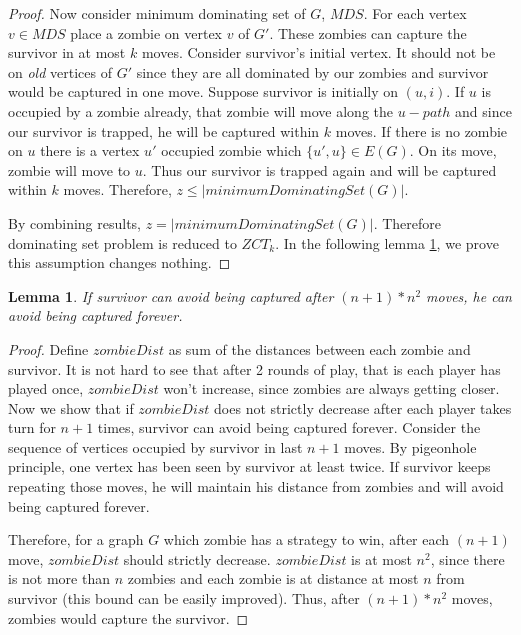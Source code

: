 \documentclass[1p]{elsarticle}
\newtheorem{lemma}[theorem]{Lemma}
\begin{document}
\begin{proof}
		Now consider minimum dominating set of $G$, $MDS$. For each vertex $v \in MDS$ place a zombie on vertex $v$
		of $G'$. These zombies can capture the survivor in at most $k$ moves. Consider survivor's initial vertex. It
		should not be on {\it old} vertices of $G'$ since they are all dominated by our zombies and survivor would be
		captured in one move. Suppose survivor is initially on $(u,i)$. If $u$ is occupied by a zombie already, that
		zombie will move along the $u-path$ and since our survivor is trapped, he will be captured within $k$ moves. If
		there is no zombie on $u$ there is a vertex $u'$ occupied zombie which $ \{u',u\} \in E(G)$. On its move, zombie
		will move to $u$. Thus our survivor is trapped again and will be captured within $k$ moves. Therefore, $z \leq
		|minimumDominatingSet(G)|$.

		By combining results, $z = |minimumDominatingSet(G)|$. Therefore dominating set problem is reduced to $ZCT_k$.
		In the following lemma \ref{limit-moves}, we prove this assumption changes nothing.

	\end{proof}

	\begin{lemma}
		\label{limit-moves}
		If survivor can avoid being captured after $(n + 1) * n^2$ moves, he can avoid being captured forever.
	\end{lemma}
	\begin{proof}
		Define $zombieDist$ as sum of the distances between each zombie and survivor. It is not hard to see that after 2
		rounds of play, that is each player has played once, $zombieDist$ won't increase, since zombies are always
		getting closer. Now we show that if $zombieDist$ does not strictly decrease after each player takes turn for $n
		+ 1$ times, survivor can avoid being captured forever. Consider the sequence of vertices occupied by survivor in
		last $n + 1$ moves. By pigeonhole principle, one vertex has been seen by survivor at least twice. If survivor keeps
		repeating those moves, he will maintain his distance from zombies and will avoid being captured forever.

		Therefore, for a graph $G$ which zombie has a strategy to win, after each $(n + 1)$ move, $zombieDist$ should
		strictly decrease. $zombieDist$ is at most $n^2$, since there is not more than $n$ zombies and each zombie is at
		distance at most $n$ from survivor (this bound can be easily improved). Thus, after $(n + 1) * n^2$ moves,
		zombies would capture the survivor.
	\end{proof}
\end{document}
